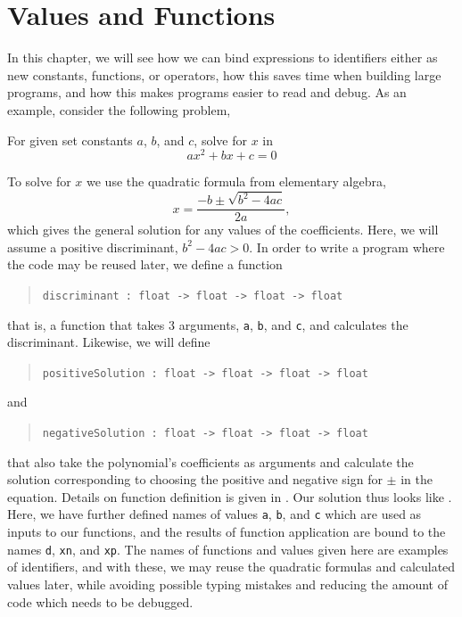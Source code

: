 \documentclass[fsharpnotes.tex]{subfiles}
\begin{document}
\chapter{Values and Functions}
\label{chap:let}
%
In this chapter, we will see how we can bind expressions to identifiers either as new constants, functions, or operators, how this saves time when building large programs, and how this makes programs easier to read and debug. As an example, consider the following problem,
\begin{problem}
  For given set constants $a$, $b$, and $c$, solve for $x$ in
  \begin{equation}
  a x^2+bx+c = 0
\end{equation}
\end{problem}
To solve for $x$ we use the quadratic formula from elementary algebra,
\begin{equation}
  x = \frac{-b\pm\sqrt{b^2-4ac}}{2a},
\end{equation}
which gives the general solution for any values of the coefficients. Here, we will assume a positive discriminant, $b^2-4ac>0$. In order to write a program where the code may be reused later, we define a function
\begin{quote}
  \lstinline!discriminant : float -> float -> float -> float!
\end{quote}
that is, a function that takes 3 arguments, \lstinline!a!, \lstinline!b!, and \lstinline!c!, and calculates the discriminant. Likewise, we will define
\begin{quote}
  \lstinline!positiveSolution : float -> float -> float -> float!
\end{quote}
and
\begin{quote}
  \lstinline!negativeSolution : float -> float -> float -> float!
\end{quote}
that also take the polynomial's coefficients as arguments and calculate the solution corresponding to choosing the positive and negative sign for $\pm$ in the equation. Details on function definition is given in . Our solution thus looks like .
%
%
Here, we have further defined names of values \lstinline!a!, \lstinline!b!, and \lstinline!c! which are used as inputs to our functions, and the results of function application are bound to the names \lstinline!d!, \lstinline!xn!, and \lstinline!xp!. The names of functions and values given here are examples of identifiers, and with these, we may reuse the quadratic formulas and calculated values later, while avoiding possible typing mistakes and reducing the amount of code which needs to be debugged.
\end{document}
